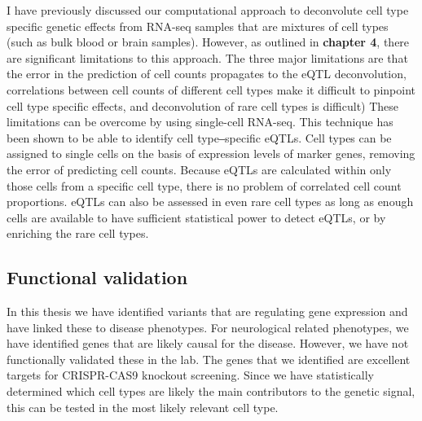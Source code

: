I have previously discussed our computational approach to deconvolute cell type specific genetic effects from RNA-seq samples that are mixtures of cell types (such as bulk blood or brain samples). However, as outlined in \textbf{chapter 4}, there are significant limitations to this approach. The three major limitations are that the error in the prediction of cell counts propagates to the eQTL deconvolution, correlations between cell counts of different cell types make it difficult to pinpoint cell type specific effects, and deconvolution of rare cell types is difficult) These limitations can be overcome by using single-cell RNA-seq\cite{tangMRNASeqWholetranscriptomeAnalysis2009}. This technique has been shown to be able to identify cell type‒specific eQTLs\cite{wijstSinglecellRNASequencing2018}. Cell types can be assigned to single cells on the basis of expression levels of marker genes, removing the error of predicting cell counts. Because eQTLs are calculated within only those cells from a specific cell type, there is no problem of correlated cell count proportions. eQTLs can also be assessed in even rare cell types as long as enough cells are available to have sufficient statistical power to detect eQTLs, or by enriching the rare cell types.


\subsection{Functional validation}

In this thesis we have identified variants that are regulating gene expression and have linked these to disease phenotypes. For neurological related phenotypes, we have identified genes that are likely causal for the disease. However, we have not functionally validated these in the lab. The genes that we identified are excellent targets for CRISPR-CAS9 knockout screening\cite{agrotisNewAgeFunctional2015}. Since we have statistically determined which cell types are likely the main contributors to the genetic signal, this can be tested in the most likely relevant cell type. 

